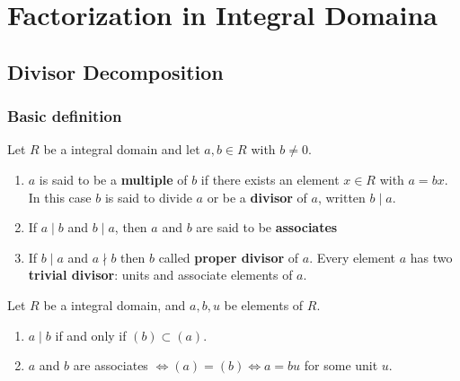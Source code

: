 \chapter{Factorization in Integral Domaina} %

\section{Divisor Decomposition} %
\subsection{Basic definition} %
\begin{definition}
    Let $R$ be a integral domain and let $a, b \in R$ with $b \neq 0$.
    \begin{enumerate}
        \item
              $a$ is said to be a \textbf{multiple} of $b$ if there exists an element $x \in R$ with $a=b x$. In this case $b$ is said to divide $a$ or be a \textbf{divisor} of $a$, written $b \mid a$.

        \item
              If $a\mid b$ and $b\mid a$, then $a$ and $b$ are said to be \textbf{associates}

        \item
              If $b \mid a$ and $a\nmid b$ then $b$ called \textbf{proper divisor} of $a$. Every element $a$ has two \textbf{trivial divisor}: units and associate elements of $a$.
    \end{enumerate}
\end{definition}


\begin{theorem}
    Let $R$ be a integral domain, and $a, b,u$ be elements of $R$.
    \begin{enumerate}
        \item
              ${a} \mid {b}$ if and only if $({b}) \subset({a})$.

        \item
              $a$ and $b$ are associates $\Leftrightarrow (a)=(b) \Leftrightarrow a=bu$ for some unit $u$.
    \end{enumerate}
\end{theorem}


